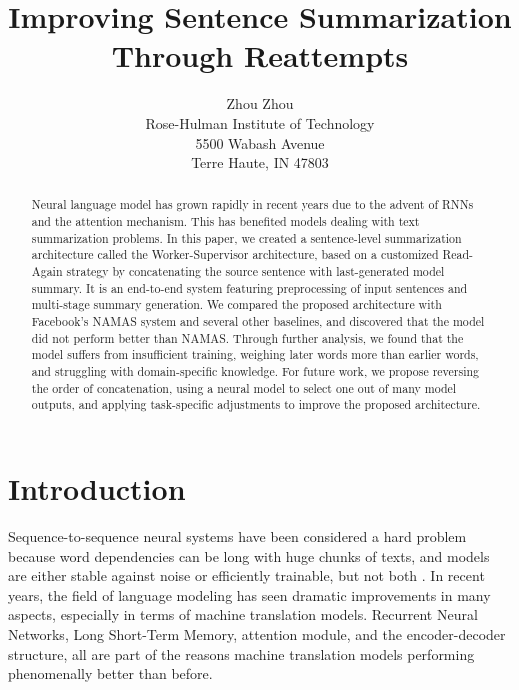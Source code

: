 \documentclass[letterpaper]{article} %
\begin{document}
%
\title{Improving Sentence Summarization Through Reattempts}
\author{Zhou Zhou\\
Rose-Hulman Institute of Technology\\
5500 Wabash Avenue\\
Terre Haute, IN 47803\\
}
\maketitle
\begin{abstract}
Neural language model has grown rapidly in recent years due to the advent of RNNs and the attention mechanism. This has benefited models dealing with text summarization problems. In this paper, we created a sentence-level summarization architecture called the Worker-Supervisor architecture, based on a customized Read-Again strategy by concatenating the source sentence with last-generated model summary. It is an end-to-end system featuring preprocessing of input sentences and multi-stage summary generation. We compared the proposed architecture with Facebook's NAMAS system and several other baselines, and discovered that the model did not perform better than NAMAS. Through further analysis, we found that the model suffers from insufficient training, weighing later words more than earlier words, and struggling with domain-specific knowledge. For future work, we propose reversing the order of concatenation, using a neural model to select one out of many model outputs, and applying task-specific adjustments to improve the proposed architecture. 
\end{abstract}

\section{Introduction}
Sequence-to-sequence neural systems have been considered a hard problem because word dependencies can be long with huge chunks of texts, and models are either stable against noise or efficiently trainable, but not both \cite{bengio1994learning}. In recent years, the field of language modeling has seen dramatic improvements in many aspects, especially in terms of machine translation models. Recurrent Neural Networks, Long Short-Term Memory, attention module, and the encoder-decoder structure, all are part of the reasons machine translation models performing phenomenally better than before.
\end{document}
